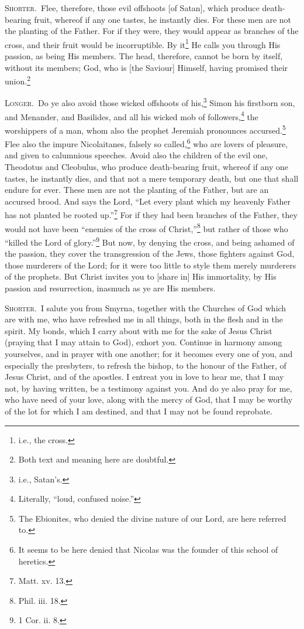 
\textsc{Shorter.}~Flee, therefore, those evil offshoots [of Satan], which produce death-bearing fruit, whereof if any one tastes, he instantly dies. For these men are not the planting of the Father. For if they were, they would appear as branches of the cross, and their fruit would be incorruptible. By it\footnote{i.e., the cross.} He calls you through His passion, as being His members. The head, therefore, cannot be born by itself, without its members; God, who is [the Saviour] Himself, having promised their union.\footnote{Both text and meaning here are doubtful.}

\textsc{Longer.}~Do ye also avoid those wicked offshoots of his,\footnote{i.e., Satan’s.} Simon his firstborn son, and Menander, and Basilides, and all his wicked mob of followers,\footnote{Literally, “loud, confused noise.”} the worshippers of a man, whom also the prophet Jeremiah pronounces accursed.\footnote{The Ebionites, who denied the divine nature of our Lord, are here referred to.} Flee also the impure Nicolaitanes, falsely so called,\footnote{It seems to be here denied that Nicolas was the founder of this school of heretics.} who are lovers of pleasure, and given to calumnious speeches. Avoid also the children of the evil one, Theodotus and Cleobulus, who produce death-bearing fruit, whereof if any one tastes, he instantly dies, and that not a mere temporary death, but one that shall endure for ever. These men are not the planting of the Father, but are an accursed brood. And says the Lord, “Let every plant which my heavenly Father has not planted be rooted up.”\footnote{Matt. xv. 13.} For if they had been branches of the Father, they would not have been “enemies of the cross of Christ,”\footnote{Phil. iii. 18.} but rather of those who “killed the Lord of glory.”\footnote{1 Cor. ii. 8.} But now, by denying the cross, and being ashamed of the passion, they cover the transgression of the Jews, those fighters against God, those murderers of the Lord; for it were too little to style them merely murderers of the prophets. But Christ invites you to [share in] His immortality, by His passion and resurrection, inasmuch as ye are His members.


\textsc{Shorter.}~I salute you from Smyrna, together with the Churches of God which are with me, who have refreshed me in all things, both in the flesh and in the spirit. My bonds, which I carry about with me for the sake of Jesus Christ (praying that I may attain to God), exhort you. Continue in harmony among yourselves, and in prayer with one another; for it becomes every one of you, and especially the presbyters, to refresh the bishop, to the honour of the Father, of Jesus Christ, and of the apostles. I entreat you in love to hear me, that I may not, by having written, be a testimony against you. And do ye also pray for me, who have need of your love, along with the mercy of God, that I may be worthy of the lot for which I am destined, and that I may not be found reprobate.

